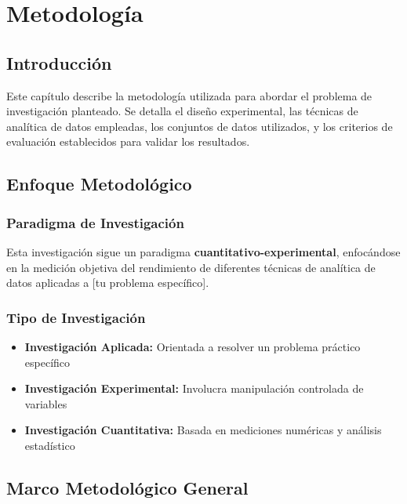 
\chapter{Metodología}

\section{Introducción}

Este capítulo describe la metodología utilizada para abordar el problema de investigación planteado. Se detalla el diseño experimental, las técnicas de analítica de datos empleadas, los conjuntos de datos utilizados, y los criterios de evaluación establecidos para validar los resultados.

\section{Enfoque Metodológico}

\subsection{Paradigma de Investigación}

Esta investigación sigue un paradigma \textbf{cuantitativo-experimental}, enfocándose en la medición objetiva del rendimiento de diferentes técnicas de analítica de datos aplicadas a [tu problema específico].

\subsection{Tipo de Investigación}

\begin{itemize}
    \item \textbf{Investigación Aplicada:} Orientada a resolver un problema práctico específico
    \item \textbf{Investigación Experimental:} Involucra manipulación controlada de variables
    \item \textbf{Investigación Cuantitativa:} Basada en mediciones numéricas y análisis estadístico
\end{itemize}

\section{Marco Metodológico General}

